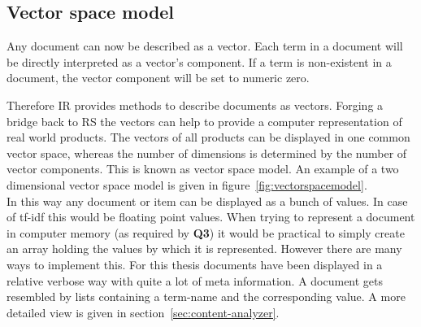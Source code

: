 \subsection{Vector space model}
\label{sec:vectorspacemodel}
Any document can now be described as a vector.
Each term in a document will be directly interpreted as a vector's component.
If a term is non-existent in a document, the vector component will be set to numeric zero.\citep[p.~120]{manning:2009}

Therefore IR provides methods to describe documents as vectors.
Forging a bridge back to RS the vectors can help to provide a computer representation of real world products.
The vectors of all products can be displayed in one common vector space, whereas the number of dimensions is determined by the number of vector components.
This is known as vector space model.\citep[p.~120]{manning:2009}
An example of a two dimensional vector space model is given in figure~\ref{fig:vectorspacemodel}.
\\

In this way any document or item can be displayed as a bunch of values.
In case of tf-idf this would be floating point values.
When trying to represent a document in computer memory (as required by \textbf{Q3}) it would be practical to simply create an array holding the values by which it is represented.
However there are many ways to implement this.
For this thesis documents have been displayed in a relative verbose way with quite a lot of meta information.
A document gets resembled by lists containing a term-name and the corresponding value.
A more detailed view is given in section~\ref{sec:content-analyzer}.

